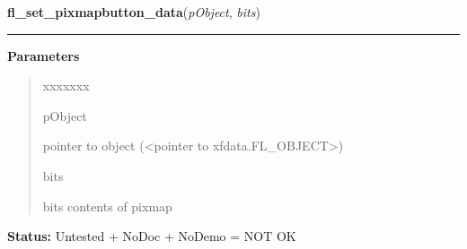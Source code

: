     \label{xformslib:library:fl_set_pixmap_data}

    \vspace{0.5ex}

\hspace{.8\funcindent}\begin{boxedminipage}{\funcwidth}

    \raggedright \textbf{fl\_set\_pixmapbutton\_data}(\textit{pObject}, \textit{bits})

    \vspace{-1.5ex}

    \rule{\textwidth}{0.5\fboxrule}
\setlength{\parskip}{2ex}
\setlength{\parskip}{1ex}
      \textbf{Parameters}
      \vspace{-1ex}

      \begin{quote}
        \begin{Ventry}{xxxxxxx}

          \item[pObject]

          pointer to object ({\textless}pointer to 
          xfdata.FL\_OBJECT{\textgreater})

          \item[bits]

          bits contents of pixmap

        \end{Ventry}

      \end{quote}

\textbf{Status:} Untested + NoDoc + NoDemo = NOT OK



    \end{boxedminipage}

    \label{xformslib:library:fl_set_pixmapbutton_focus_outline}

    \vspace{0.5ex}

